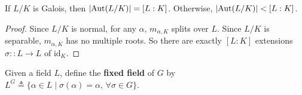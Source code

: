 \begin{theorem}
  If $L/K$ is Galois, then $\lvert\operatorname{Aut}(L/K)\rvert = [L:K]$. Otherwise, $\lvert\operatorname{Aut}(L/K)\rvert < [L:K]$.

  \begin{proof}
    Since $L/K$ is normal, for any $\alpha$, $m_{\alpha, K}$ splits over $L$.
    Since $L/K$ is separable, $m_{\alpha, K}$ has no multiple roots. So there are exactly $[L:K]$
    extensions $\sigma:: L \to L$ of $\text{id}_K$.
  \end{proof}
\end{theorem}

\begin{definition}
  Given a field $L$, define the {\bf fixed field} of $G$ by
  $L^G \triangleq \{ \alpha \in L \mid \sigma(\alpha) = \alpha, \, \forall \sigma \in G \}$.
\end{definition}

